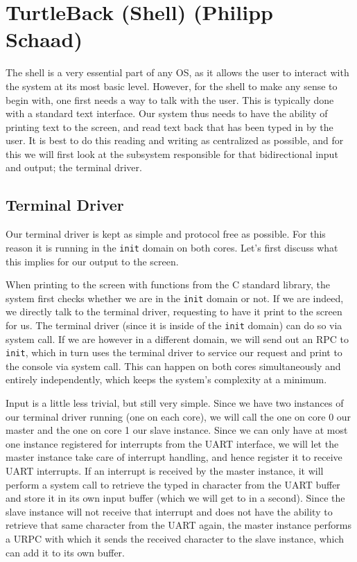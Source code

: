 \section{TurtleBack (Shell) (Philipp Schaad)}\label{s:turtle-back-shell}

The shell is a very essential part of any OS, as it allows the user to interact 
with the system at its most basic level. However, for the shell to make any 
sense to begin with, one first needs a way to talk with the user. This is 
typically done with a standard text interface. Our system thus needs to have 
the ability of printing text to the screen, and read text back that has been 
typed in by the user. It is best to do this reading and writing as centralized 
as possible, and for this we will first look at the subsystem responsible for 
that bidirectional input and output; the terminal driver.

\subsection{Terminal Driver}\label{ss:terminal-driver}

Our terminal driver is kept as simple and protocol free as possible. For this 
reason it is running in the \texttt{init} domain on both cores. Let's 
first discuss what this implies for our output to the screen.
\medskip

When printing to the screen with functions from the C standard library, the 
system first checks whether we are in the \texttt{init} domain or not. If we 
are indeed, we directly talk to the terminal driver, requesting to have it 
print to the screen for us. The terminal driver (since it is inside of the 
\texttt{init} domain) can do so via system call. If we are however in a 
different domain, we will send out an RPC to \texttt{init}, which in turn uses 
the terminal driver to service our request and print to the console via system 
call. This can happen on both cores simultaneously and entirely independently, 
which keeps the system's complexity at a minimum.
\medskip

Input is a little less trivial, but still very simple. Since we have two 
instances of our terminal driver running (one on each core), we will call the 
one on core 0 our master and the one on core 1 our slave instance. Since we can 
only have at most one instance registered for interrupts from the UART 
interface, we will let the master instance take care of interrupt handling, and 
hence register it to receive UART interrupts. If an interrupt is received by 
the master instance, it will perform a system call to retrieve the typed in 
character from the UART buffer and store it in its own input buffer (which we 
will get to in a second). Since the slave instance will not receive that 
interrupt and does not have the ability to retrieve that same character from 
the UART again, the master instance performs a URPC with which it sends the 
received character to the slave instance, which can add it to its own buffer.

